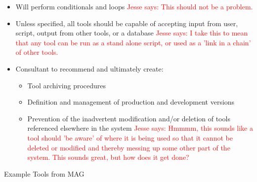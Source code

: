 \documentclass[titlepage]{article}
\begin{document}
\begin{itemize}
	\item Will perform conditionals and loops
		\textcolor{red}{Jesse says: This should not be a problem.}
	\item Unless specified, all tools should be capable of accepting input from user, script, output from other tools, or a database
		\textcolor{red}{Jesse says: I take this to mean that any tool can be run as a stand alone script, or used as a 'link in a chain' of other tools.}
	\item Consultant to recommend and ultimately create:
		\begin{itemize}
			\item Tool archiving procedures
			\item Definition and management of production and development versions
			\item Prevention of the inadvertent modification and/or deletion of tools referenced elsewhere in the system
				\textcolor{red}{Jesse says: Hmmmm, this sounds like a tool should 'be aware' of where it is being used so that it cannot be deleted or modified and thereby messing up some other part of the system.  This sounds great, but how does it get done?}
		\end{itemize}
\end{itemize}
Example Tools from MAG
\end{document}
